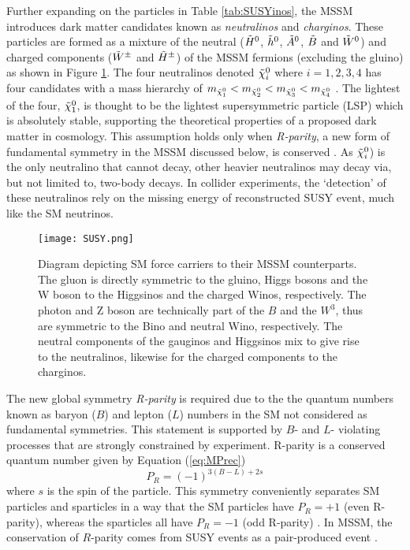 Further expanding on the particles in Table \ref{tab:SUSYinos}, the MSSM introduces dark matter candidates known as \textit{neutralinos}  and \textit{charginos}. These particles are formed as a mixture of the neutral ($\Tilde{H}^0$, $\Tilde{h}^0$, $ \Tilde{A}^0 $, $\Tilde{B}$ and $\Tilde{W}^0$) and charged components ($\Tilde{W}^\pm$ and $\Tilde{H}^\pm$) of the MSSM fermions (excluding the gluino) as shown in Figure \ref{fig:SUSY}. The four neutralinos denoted $\Tilde{\chi}_i^0$ where $i=1,2,3,4$ has four candidates with a mass hierarchy of $ m_{\Tilde{\chi}_1^0} < m_{\Tilde{\chi}_2^0} < m_{\Tilde{\chi}_3^0} < m_{\Tilde{\chi}_4^0}$ \cite{martin1997supersymmetry}. The lightest of the four, $\Tilde{\chi}_1^0$, is thought to be the lightest supersymmetric particle (LSP) which is absolutely stable, supporting the theoretical properties of a proposed dark matter in cosmology. This assumption holds only when \textit{R-parity}, a new form of fundamental symmetry in the MSSM discussed below, is conserved \cite{martin1997supersymmetry}. As $\Tilde{\chi}_i^0$) is the only neutralino that cannot decay, other heavier neutralinos may decay via, but not limited to, two-body decays. In collider experiments, the `detection' of these neutralinos rely on the missing energy of reconstructed SUSY event, much like the SM neutrinos. \\

\begin{figure}[htbp]
    \centering
    \texttt{[image: SUSY.png]}
    \caption{Diagram depicting SM force carriers to their MSSM counterparts. The gluon is directly symmetric to the gluino, Higgs bosons and the W boson to the Higgsinos and the charged Winos, respectively. The photon and Z boson are technically part of the $B$ and the $W^3$, thus are symmetric to the Bino and neutral Wino, respectively. The neutral components of the gauginos and Higgsinos mix to give rise to the neutralinos, likewise for the charged components to the charginos.}
    \label{fig:SUSY}
\end{figure}

The new global symmetry \textit{R-parity} is required due to the the quantum numbers known as baryon ($B$) and lepton ($L$) numbers in the SM not considered as fundamental symmetries. This statement is supported by $B$- and $L$- violating processes that are strongly constrained by experiment. R-parity is a conserved quantum number given by Equation (\ref{eq:MPrec})
\begin{equation}
    P_R=(-1)^{3(B-L)+2s}
    \label{eq:MPrec}
\end{equation}
where $s$ is the spin of the particle. This symmetry conveniently separates SM particles and sparticles in a way that the SM particles have $P_R=+1$ (even R-parity), whereas the sparticles all have $P_R=-1$ (odd R-parity) \cite{martin1997supersymmetry}. In MSSM, the conservation of $R$-parity comes from SUSY events as a pair-produced event \cite{aitchison2007supersymmetry}. \\

